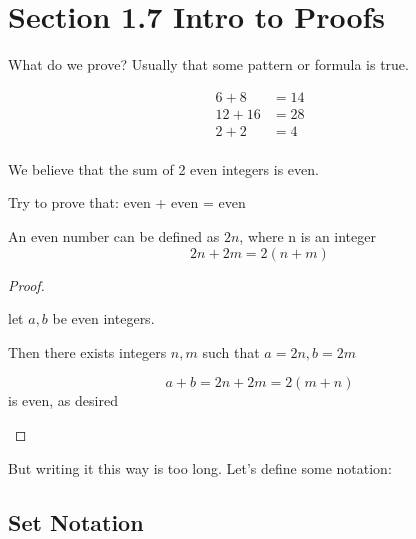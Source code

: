 \documentclass[../../Main.tex]{subfiles}
\begin{document}
\section{Section 1.7 Intro to Proofs}

What do we prove? 
Usually that some pattern or formula is true.

\begin{example}
    \begin{align*}
        6 + 8 &= 14 \\
        12 + 16 &= 28 \\
        2 + 2 &= 4 \\
    \end{align*}

    We believe that the sum of 2 even integers is even.

    Try to prove that: even + even = even

    \medskip

    \begin{work}
        \begin{center}
            An even number can be defined as $2n$, where n is an integer
            $$2n + 2m = 2(n + m)$$
        \end{center}
    \end{work}

    \begin{proof}
        \begin{center}
            let $a, b$ be even integers.

            Then there exists integers $n, m$ such that $a = 2n, b=2m$

            $$ a + b = 2n + 2m = 2(m + n) $$ is even, as desired
        \end{center}
    \end{proof}

\end{example}

But writing it this way is too long. Let's define some notation:

\subsection{Set Notation}
\end{document}
